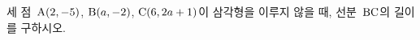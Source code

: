 세 점~$\mathrm{A}(2{,}\mkern3mu\mathopen{}-5)$, $\mathrm{B}(a{,}\mkern3mu\mathopen{}-2)$, $\mathrm{C}(6{,}\mkern3mu\mathopen{}2a+1)$이 삼각형을 이루지 않을 때, 선분~$\mathrm{BC}$의 길이를 구하시오. 
